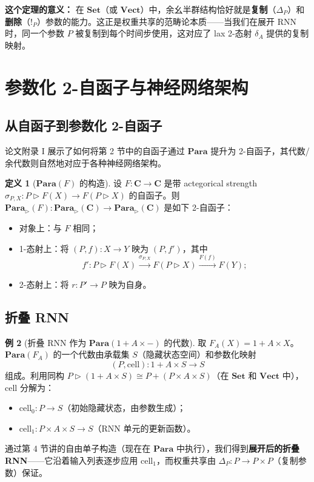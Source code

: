\documentclass[12pt,a4paper]{ctexart}
\theoremstyle{definition}
\newtheorem{definition}{定义}[section]
\newtheorem{example}[definition]{例}
\newcommand{\cat}[1]{\mathbf{#1}}
\newcommand{\Set}{\cat{Set}}
\newcommand{\Vect}{\cat{Vect}}
\newcommand{\Para}{\cat{Para}}
\newcommand{\cell}{\mathrm{cell}}
\begin{document}
\textbf{这个定理的意义：} 在 $\Set$（或 $\Vect$）中，余幺半群结构恰好就是\textbf{复制}（$\Delta_P$）和\textbf{删除}（$!_P$）参数的能力。这正是权重共享的范畴论本质——当我们在展开 RNN 时，同一个参数 $P$ 被复制到每个时间步使用，这对应了 lax 2-态射 $\delta_A$ 提供的复制映射。

\newpage

\section{参数化 2-自函子与神经网络架构}

\subsection{从自函子到参数化 2-自函子}

论文附录 I 展示了如何将第 2 节中的自函子通过 $\Para$ 提升为 2-自函子，其代数/余代数则自然地对应于各种神经网络架构。

\begin{definition}[$\Para(F)$ 的构造]\label{def:para-endo}
设 $F:\cat C\to\cat C$ 是带 actegorical strength $\sigma_{P,X}:P\rhd F(X)\to F(P\rhd X)$ 的自函子。则 $\Para_\rhd(F):\Para_\rhd(\cat C)\to\Para_\rhd(\cat C)$ 是如下 2-自函子：
\begin{itemize}[nosep]
    \item 对象上：与 $F$ 相同；
    \item 1-态射上：将 $(P,f):X\to Y$ 映为 $(P,f')$，其中
    \[f':P\rhd F(X)\xrightarrow{\sigma_{P,X}} F(P\rhd X)\xrightarrow{F(f)} F(Y);\]
    \item 2-态射上：将 $r:P'\to P$ 映为自身。
\end{itemize}
\end{definition}

\subsection{折叠 RNN}

\begin{example}[折叠 RNN 作为 $\Para(1+A\times-)$ 的代数]\label{ex:folding-rnn}
取 $F_A(X)=1+A\times X$。$\Para(F_A)$ 的一个代数由承载集 $S$（隐藏状态空间）和参数化映射
\[(P,\cell):1+A\times S\longrightarrow S\]
组成。利用同构 $P\rhd(1+A\times S)\cong P+(P\times A\times S)$（在 $\Set$ 和 $\Vect$ 中），$\cell$ 分解为：
\begin{itemize}[nosep]
    \item $\cell_0:P\to S$（初始隐藏状态，由参数生成）；
    \item $\cell_1:P\times A\times S\to S$（RNN 单元的更新函数）。
\end{itemize}

通过第 4 节讲的自由单子构造（现在在 $\Para$ 中执行），我们得到\textbf{展开后的折叠 RNN}——它沿着输入列表逐步应用 $\cell_1$，而权重共享由 $\Delta_P:P\to P\times P$（复制参数）保证。
\end{example}
\end{document}
